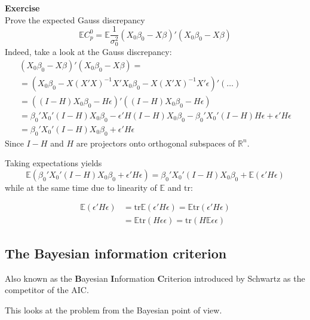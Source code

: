\documentclass[a4paper]{article}
\newcommand{\brac}[1]{{\left ( #1 \right )}}
\newcommand{\Real}{\mathbb{R}}
\newcommand{\ex}{\mathbb{E}}
\newcommand{\tr}{\text{tr}}
\begin{document}
\textbf{Exercise}\\
Prove the expected Gauss discrepancy
\[\ex C_p^0 = \ex \frac{1}{\sigma^2_0}\brac{X_0\beta_0 -X \beta}'\brac{X_0\beta_0 -X \beta}\]
Indeed, take a look at the Gauss discrepancy:
\begin{multline*}
	\brac{X_0\beta_0 -X \beta}'\brac{X_0\beta_0 -X \beta} = \\
	= \brac{X_0\beta_0 - X \brac{X'X}^{-1}X'X_0\beta_0 - X \brac{X'X}^{-1}X'\epsilon }'\brac{ \ldots }\\
	= \brac{ (I - H )X_0\beta_0 - H \epsilon }'\brac{ (I - H )X_0\beta_0 - H \epsilon }\\
	= \beta_0'X_0'(I-H)X_0\beta_0 - \epsilon'H(I-H)X_0\beta_0 - \beta_0'X_0'(I-H)H \epsilon + \epsilon'H\epsilon\\
	= \beta_0'X_0'(I-H)X_0\beta_0 + \epsilon'H\epsilon
\end{multline*}
Since $I-H$ and $H$ are projectors onto orthogonal subspaces of $\Real^n$.

Taking expectations yields
\[\ex\brac{\beta_0'X_0'(I-H)X_0\beta_0 + \epsilon'H\epsilon} = \beta_0'X_0'(I-H)X_0\beta_0 + \ex\brac{\epsilon'H\epsilon}\]
while at the same time due to linearity of $\ex$ and $\tr$:

\begin{align*}
\ex(\epsilon'H\epsilon) &= \tr\ex(\epsilon'H\epsilon) = \ex\tr(\epsilon'H\epsilon) \\
&= \ex\tr(H\epsilon\epsilon) = \tr(H\ex\epsilon\epsilon)
\end{align*}


\subsection{The Bayesian information criterion} %
\label{sub:the_bayesian_information_criterion}

Also known as the \textbf{B}ayesian \textbf{I}nformation \textbf{C}riterion introduced by Schwartz as the competitor of the AIC.

This looks at the problem from the Bayesian point of view.
\end{document}
